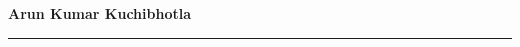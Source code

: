 \documentclass[10pt]{article}
\numberwithin{myalgctr}{section}
\begin{document}
% 
% 
{\large\bf\noindent Arun Kumar Kuchibhotla}\\
\rule{\textwidth}{1pt}
\end{document}
